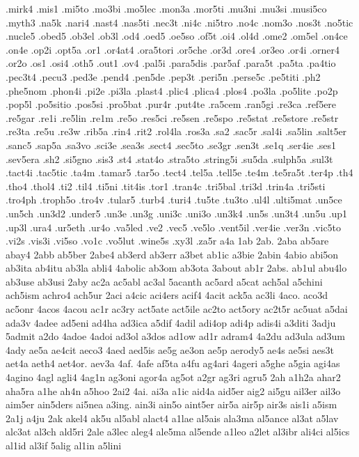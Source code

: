 {.mirk4
.mis1
.mi5to
.mo3bi
.mo5lec
.mon3a
.mor5ti
.mu3ni
.mu3si
.musi5co
.myth3
.na5k
.nari4
.nast4
.nas5ti
.nec3t
.ni4c
.ni5tro
.no4c
.nom3o
.nos3t
.no5tic
.nucle5
.obed5
.ob3el
.ob3l
.od4
.oed5
.oe5so
.of5t
.oi4
.ol4d
.ome2
.om5el
.on4ce
.on4e
.op2i
.opt5a
.or1
.or4at4
.ora5tori
.or5che
.or3d
.ore4
.or3eo
.or4i
.orner4
.or2o
.os1
.osi4
.oth5
.out1
.ov4
.pal5i
.para5dis
.par5af
.para5t
.pa5ta
.pa4tio
.pec3t4
.pecu3
.ped3e
.pend4
.pen5de
.pep3t
.peri5n
.perse5c
.pe5titi
.ph2
.phe5nom
.phon4i
.pi2e
.pi3la
.plast4
.plic4
.plica4
.plos4
.po3la
.po5lite
.po2p
.pop5l
.po5sitio
.pos5si
.pro5bat
.pur4r
.put4te
.ra5cem
.ran5gi
.re3ca
.ref5ere
.re5gar
.re1i
.re5lin
.re1m
.re5o
.res5ci
.re5sen
.re5spo
.re5stat
.re5store
.re5str
.re3ta
.re5u
.re3w
.rib5a
.rin4
.rit2
.rol4la
.ros3a
.sa2
.sac5r
.sal4i
.sa5lin
.salt5er
.sanc5
.sap5a
.sa3vo
.sci3e
.sea3s
.sect4
.sec5to
.se3gr
.sen3t
.se1q
.ser4ie
.ses1
.sev5era
.sh2
.si5gno
.sis3
.st4
.stat4o
.stra5to
.string5i
.su5da
.sulph5a
.sul3t
.tact4i
.tac5tic
.ta4m
.tamar5
.tar5o
.tect4
.tel5a
.tell5e
.te4m
.te5ra5t
.ter4p
.th4
.tho4
.thol4
.ti2
.til4
.ti5ni
.tit4is
.tor1
.tran4c
.tri5bal
.tri3d
.trin4a
.tri5sti
.tro4ph
.troph5o
.tro4v
.tular5
.turb4
.turi4
.tu5te
.tu3to
.ul4l
.ulti5mat
.un5ce
.un5ch
.un3d2
.under5
.un3e
.un3g
.uni3c
.uni3o
.un3k4
.un5s
.un3t4
.un5u
.up1
.up3l
.ura4
.ur5eth
.ur4o
.va5led
.ve2
.vec5
.ve5lo
.vent5il
.ver4ie
.ver3n
.vic5to
.vi2s
.vis3i
.vi5so
.vo1c
.vo5lut
.wine5s
.xy3l
.za5r
a4a
1ab
2ab.
2aba
ab5are
abay4
2abb
ab5ber
2abe4
ab3erd
ab3err
a3bet
ab1ic
a3bie
2abin
4abio
abi5on
ab3ita
ab4itu
ab3la
abli4
4abolic
ab3om
ab3ota
3about
ab1r
2abs.
ab1ul
abu4lo
ab3use
ab3usi
2aby
ac2a
ac5abl
ac3al
5acanth
ac5ard
a5cat
ach5al
a5chini
ach5ism
achro4
ach5ur
2aci
a4cic
aci4ers
acif4
4acit
ack5a
ac3li
4aco.
aco3d
ac5onr
4acos
4acou
ac1r
ac3ry
act5ate
act5ile
ac2to
act5ory
ac2t5r
ac5uat
a5dai
ada3v
4adee
ad5eni
ad4ha
ad3ica
a5dif
4adil
adi4op
adi4p
adis4i
a3diti
3adju
5admit
a2do
4adoe
4adoi
ad3ol
a3dos
ad1ow
ad1r
adram4
4a2du
ad3ula
ad3um
4ady
ae5a
ae4cit
aeco3
4aed
aed5is
ae5g
ae3on
ae5p
aerody5
ae4s
ae5si
aes3t
aet4a
aeth4
aet4or.
aev3a
4af.
4afe
af5ta
a4fu
ag4ari
4ageri
a5ghe
a5gia
agi4as
4agino
4agl
agli4
4ag1n
ag3oni
agor4a
ag5ot
a2gr
ag3ri
agru5
2ah
a1h2a
ahar2
aha5ra
a1he
ah4n
a5hoo
2ai2
4ai.
ai3a
a1ic
aid4a
aid5er
aig2
ai5gu
ail3er
ail3o
aim5er
ain5ders
ai5nea
a3ing.
ain3i
ain5o
aint5er
air5a
air5p
air3s
ais1i
a5ism
2a1j
a4ju
2ak
akel4
ak5u
al5abl
alact4
a1lae
al5ais
ala3ma
al5ance
al3at
a5lav
alc3at
al3ch
ald5ri
2ale
a3lec
aleg4
ale5ma
al5ende
a1leo
a2let
al3ibr
ali4ci
al5ics
al1id
al3if
5alig
al1in
a5lini
}
